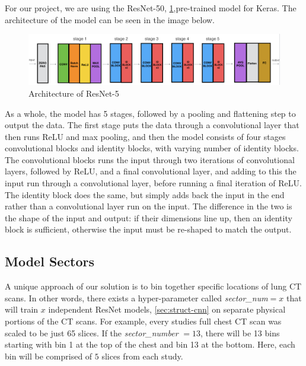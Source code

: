\documentclass[10pt,twocolumn,letterpaper]{article}
\begin{document}
        For our project, we are using the ResNet-50, \ref{fig:struct-cnn-resnet},pre-trained model for Keras. The architecture of the model can be seen in the image below.
    
        \begin{figure}
            \begin{center}
                \includegraphics[width=\textwidth]{./images/Resnet-50.png}
            \end{center}
            \caption{Architecture of ResNet-5}
            \label{fig:struct-cnn-resnet}
        \end{figure}
    
         As a whole, the model has 5 stages, followed by a pooling and flattening step to output the data. The first stage puts the data through a convolutional layer that then runs ReLU and max pooling, and then the model consists of four stages convolutional blocks and identity blocks, with varying number of identity blocks. The convolutional blocks runs the input through two iterations of convolutional layers, followed by ReLU, and a final convolutional layer, and adding to this the input run through a convolutional layer, before running a final iteration of ReLU. The identity block does the same, but simply adds back the input in the end rather than a convolutional layer run on the input. The difference in the two is the shape of the input and output: if their dimensions line up, then an identity block is sufficient, otherwise the input must be re-shaped to match the output.

   \subsection{Model Sectors} \label{sec:struct-sector}

        A unique approach of our solution is to bin together specific locations of lung CT scans. In other words, there exists
        a hyper-parameter called {\it sector\_num}$=x$ that will train $x$ independent ResNet models, \ref{sec:struct-cnn} on separate
        physical portions of the CT scans. For example, every studies full chest CT scan was scaled to be just 65 slices. If the {\it sector\_number} $=13$,
        there will be 13 bins starting with bin 1 at the top of the chest and bin 13 at the bottom. Here, each bin will be comprised
        of $5$ slices from each study.
    
\end{document}
